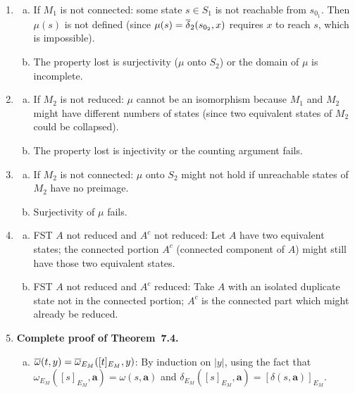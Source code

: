 \begin{enumerate}[{7.}1.]
\item \begin{enumerate}[(a)]
  \item If $M_1$ is not connected: some state $s\in S_1$ is not reachable from $s_{0_1}$.  Then $\mu(s)$ is not defined (since $\mu(s)=\overline{\delta}_2(s_{0_2},x)$ requires $x$ to reach $s$, which is impossible).
  \item The property lost is surjectivity ($\mu$ onto $S_2$) or the domain of $\mu$ is incomplete.
\end{enumerate}

\item \begin{enumerate}[(a)]
  \item If $M_2$ is not reduced: $\mu$ cannot be an isomorphism because $M_1$ and $M_2$ might have different numbers of states (since two equivalent states of $M_2$ could be collapsed).
  \item The property lost is injectivity or the counting argument fails.
\end{enumerate}

\item \begin{enumerate}[(a)]
  \item If $M_2$ is not connected: $\mu$ onto $S_2$ might not hold if unreachable states of $M_2$ have no preimage.
  \item Surjectivity of $\mu$ fails.
\end{enumerate}

\item \begin{enumerate}[(a)]
  \item FST $A$ not reduced and $A^c$ not reduced: Let $A$ have two equivalent states; the connected portion $A^c$ (connected component of $A$) might still have those two equivalent states.

  \item FST $A$ not reduced and $A^c$ reduced: Take $A$ with an isolated duplicate state not in the connected portion; $A^c$ is the connected part which might already be reduced.
\end{enumerate}

\item \textbf{Complete proof of Theorem~7.4.}

\begin{enumerate}[(a)]
  \item $\overline{\omega}(t,y)=\overline{\omega}_{E_M}([t]_{E_M},y)$: By induction on $|y|$, using the fact that $\omega_{E_M}([s]_{E_M},\pmb{a})=\omega(s,\pmb{a})$ and $\delta_{E_M}([s]_{E_M},\pmb{a})=[\delta(s,\pmb{a})]_{E_M}$.


\end{enumerate}
\end{enumerate}
